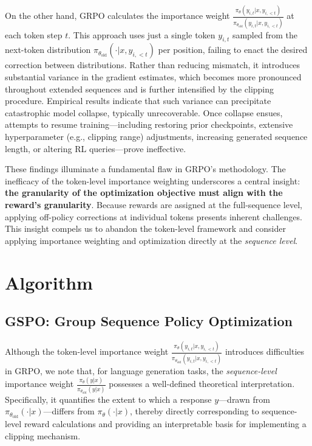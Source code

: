 On the other hand, GRPO calculates the importance weight $\frac{ \pi_{\theta} (y_{i,t} | x, y_{i,<t}) }{ \pi_{\theta_\text{old}} (y_{i,t} | x,y_{i,<t})}$ at each token step $t$. This approach uses just a single token $y_{i,t}$ sampled from the next-token distribution $\pi_{\theta_\text{old}}( \cdot | x, y_{i, <t})$ per position, failing to enact the desired correction between distributions. Rather than reducing mismatch, it introduces substantial variance in the gradient estimates, which becomes more pronounced throughout extended sequences and is further intensified by the clipping procedure. Empirical results indicate that such variance can precipitate catastrophic model collapse, typically unrecoverable. Once collapse ensues, attempts to resume training—including restoring prior checkpoints, extensive hyperparameter (e.g., clipping range) adjustments, increasing generated sequence length, or altering RL queries—prove ineffective.

These findings illuminate a fundamental flaw in GRPO's methodology. The inefficacy of the token-level importance weighting underscores a central insight: \textbf{the granularity of the optimization objective must align with the reward's granularity}. Because rewards are assigned at the full-sequence level, applying off-policy corrections at individual tokens presents inherent challenges. This insight compels us to abandon the token-level framework and consider applying importance weighting and optimization directly at the \textit{sequence level}.

\section{Algorithm}

\subsection{GSPO: Group Sequence Policy Optimization}

Although the token-level importance weight $\frac{ \pi_{\theta} (y_{i,t} | x, y_{i,<t}) }{ \pi_{\theta_\text{old}} (y_{i,t} | x,y_{i,<t})}$ introduces difficulties in GRPO, we note that, for language generation tasks, the \textit{sequence-level} importance weight $\frac{ \pi_{\theta} (y | x) }{ \pi_{\theta_\text{old}} (y | x)}$ possesses a well-defined theoretical interpretation. Specifically, it quantifies the extent to which a response $y$—drawn from $\pi_{\theta_\text{old}} (\cdot | x)$—differs from $\pi_{\theta} (\cdot | x)$, thereby directly corresponding to sequence-level reward calculations and providing an interpretable basis for implementing a clipping mechanism.

